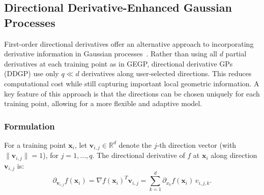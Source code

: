 \documentclass[12pt]{article}
\begin{document}
\subsection{Directional Derivative-Enhanced Gaussian Processes}
\label{subsec:ddgp}
First-order directional derivatives offer an alternative approach to incorporating derivative information in Gaussian processes~\cite{Yao2024-hp, Padidar2021-fr}. Rather than using all $d$ partial derivatives at each training point as in GEGP, directional derivative GPs (DDGP) use only $q \ll d$ derivatives along user-selected directions. This reduces computational cost while still capturing important local geometric information. A key feature of this approach is that the directions can be chosen uniquely for each training point, allowing for a more flexible and adaptive model.

\subsubsection{Formulation}
\label{subsubsec:ddgp_formulation}

For a training point $\mathbf{x}_i$, let $\mathbf{v}_{i,j} \in \mathbb{R}^d$ denote the $j$-th direction vector (with $\|\mathbf{v}_{i,j}\| = 1$), for $j = 1, \ldots, q$. The directional derivative of $f$ at $\mathbf{x}_i$ along direction $\mathbf{v}_{i,j}$ is:
\begin{equation}
	\partial_{\mathbf{v}_{i,j}} f(\mathbf{x}_i) = \nabla f(\mathbf{x}_i)^T \mathbf{v}_{i,j} = \sum_{k=1}^{d} \partial_{x_k} f(\mathbf{x}_i) \, v_{i,j,k}.
\end{equation}
\end{document}

